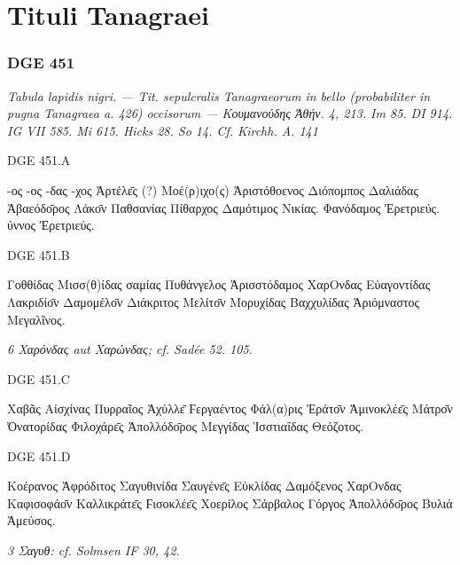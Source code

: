 \section{Tituli Tanagraei}
\subsubsection{DGE 451}
\textit{Tabula lapidis nigri. — Tit. sepulcralis Tanagraeorum in bello (probabiliter in pugna Tanagraea a. 426) occisorum — \textgreek{Κουμανούδης Ἀθήν.} 4, 213. Im 85. DI 914. IG VII 585. Mi 615. Hicks 28. So 14. Cf. Kirchh. A. 141}
\begin{versi}{DGE 451.A}
\begin{greek}
-ος {\verso[1]} -ος {\verso} -δας {\verso} -χος Ἀρτέλε̄ς (?) {\verso} Μοέ(ρ)ιχο(ς) {\verso} Ἀριστόθοενος {\verso} Διόπομπος {\verso} Δαλιάδας Ἀβαεόδο̄ρος {\verso} Λάκο̄ν {\verso} Παθσανίας {\verso} Πίθαρχος {\verso} Δαμότιμος Νικίας. {\verso} Φανόδαμος \; Ἐρετριεύς. {\verso} ύννος \; Ἐρετριεύς.
\end{greek}
\end{versi}

\begin{versi}{DGE 451.B}
\begin{greek}
Γοθθίδας {\verso[1]} Μισσ(θ)ίδας {\verso} σαμίας {\verso} Πυθάνγελος Ἀρισστόδαμος {\verso} ΧαρΟνδας {\verso} Εὐαγοντίδας {\verso} Λακριδίο̄ν {\verso} Δαμομέλο̄ν Διάκριτος {\verso} Μελίτο̄ν {\verso} Μορυχίδας {\verso} Βαχχυλίδας {\verso} Ἀριόμναστος Μεγαλῖνος.
\end{greek}
\end{versi}
\textit{6 \textgreek{Χαρόνδας} aut \textgreek{Χαρώνδας}; cf. Sadée 52. 105.}

\begin{versi}{DGE 451.C}
\begin{greek}
Χαβᾶς {\verso[1]} Αἰσχίνας {\verso} Πυρραῖος {\verso} Ἀχύλλε̄ Ϝεργαέντος {\verso} Φάλ(α)ρις {\verso} Ἐράτο̄ν {\verso} Ἀμινοκλέε̄ς {\verso} Μάτρο̄ν Ὀνατορίδας {\verso} Φιλοχάρε̄ς {\verso} Ἀπολλόδο̄ρος {\verso} Μεγγίδας {\verso} Ἱσστιαΐδας Θεόζοτος.
\end{greek}
\end{versi}

\begin{versi}{DGE 451.D}
\begin{greek}
Κοέρανος {\verso[1]} Ἀφρόδιτος {\verso} Σαγυθινίδα {\verso} Σαυγένε̄ς Εὐκλίδας {\verso} Δαμόξενος {\verso} ΧαρΟνδας {\verso} Καφισοφάο̄ν {\verso} Καλλικράτε̄ς Ϝισοκλέε̄ς {\verso} Χοερίλος {\verso} Σάρβαλος {\verso} Γόργος {\verso} Ἀπολλόδο̄ρος Βυλιά {\verso} Ἀμεύσος.
\end{greek}
\end{versi}
\textit{3 \textgreek{Σαγυθ}: cf. Solmsen IF 30, 42.}

